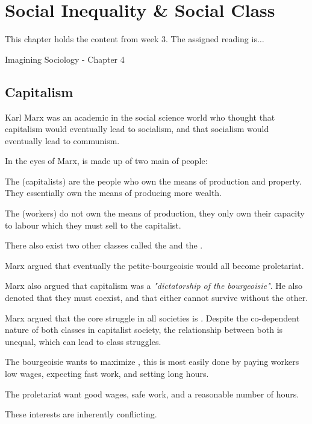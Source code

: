 \chapter{Social Inequality \& Social Class}

This chapter holds the content from week 3. The assigned reading is$\ldots$
\begin{bullets}
	\item Imagining Sociology - Chapter 4
\end{bullets}

\section{Capitalism}

Karl Marx was an academic in the social science world who thought that capitalism would eventually lead to socialism, and that socialism would eventually lead to communism.

In the eyes of Marx,  is made up of two main  of people:
\begin{bullets}
	\item The  (capitalists) are the people who own the means of production and property. They essentially own the means of producing more wealth.
	\item The  (workers) do not own the means of production, they only own their capacity to labour which they must sell to the capitalist.
\end{bullets}

There also exist two other classes called the  and the .
\begin{bullets}
	\item Marx argued that eventually the petite-bourgeoisie would all become proletariat.
\end{bullets}


Marx also argued that capitalism was a \textit{"dictatorship of the bourgeoisie"}. He also denoted that they must coexist, and that either cannot survive without the other.

Marx argued that the core struggle in all societies is . Despite the co-dependent nature of both classes in capitalist society, the relationship between both is unequal, which can lead to class struggles.
\begin{bullets}
	\item The bourgeoisie wants to maximize , this is most easily done by paying workers low wages, expecting fast work, and setting long hours.
	\item The proletariat want good wages, safe work, and a reasonable number of hours.
\end{bullets}
These interests are inherently conflicting.

